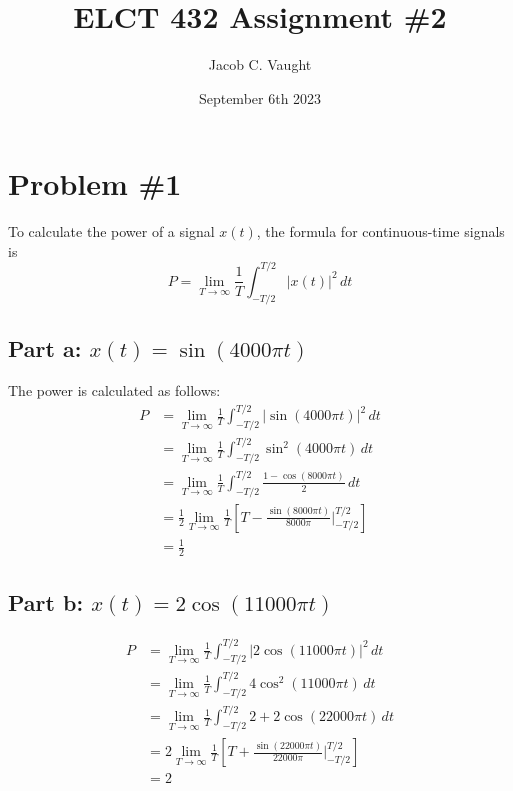 \documentclass{article}
\title{ELCT 432 Assignment \#2}
\author{Jacob C. Vaught}
\date{September 6th 2023}
\begin{document}
\maketitle

\newpage
\section*{Problem \#1}
To calculate the power of a signal \(x(t)\), the formula for continuous-time signals is
\[
P = \lim_{{T \to \infty}} \frac{1}{T} \int_{{-T/2}}^{{T/2}} |x(t)|^2 \, dt
\]

\subsection*{Part a: \( x(t) = \sin(4000 \pi t) \)}

The power is calculated as follows:
\[
\begin{aligned}
P &= \lim_{{T \to \infty}} \frac{1}{T} \int_{{-T/2}}^{{T/2}} |\sin(4000 \pi t)|^2 \, dt \\
&= \lim_{{T \to \infty}} \frac{1}{T} \int_{{-T/2}}^{{T/2}} \sin^2(4000 \pi t) \, dt \\
&= \lim_{{T \to \infty}} \frac{1}{T} \int_{{-T/2}}^{{T/2}} \frac{1 - \cos(8000 \pi t)}{2} \, dt \\
&= \frac{1}{2} \lim_{{T \to \infty}} \frac{1}{T} \left[ T - \frac{\sin(8000 \pi t)}{8000 \pi} \Bigg|_{{-T/2}}^{{T/2}} \right] \\
&= \frac{1}{2}
\end{aligned}
\]

\subsection*{Part b: \( x(t) = 2 \cos(11000 \pi t) \)}

\[
\begin{aligned}
P &= \lim_{{T \to \infty}} \frac{1}{T} \int_{{-T/2}}^{{T/2}} |2 \cos(11000 \pi t)|^2 \, dt \\
&= \lim_{{T \to \infty}} \frac{1}{T} \int_{{-T/2}}^{{T/2}} 4 \cos^2(11000 \pi t) \, dt \\
&= \lim_{{T \to \infty}} \frac{1}{T} \int_{{-T/2}}^{{T/2}} 2 + 2 \cos(22000 \pi t) \, dt \\
&= 2 \lim_{{T \to \infty}} \frac{1}{T} \left[ T + \frac{\sin(22000 \pi t)}{22000 \pi} \Bigg|_{{-T/2}}^{{T/2}} \right] \\
&= 2
\end{aligned}
\]
\end{document}
